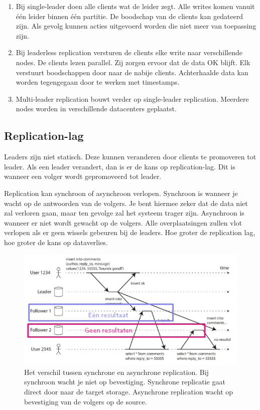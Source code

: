 \documentclass[a4paper,10pt,twoside]{report}
\begin{document}
\begin{enumerate}
	\item  Bij single-leader doen alle clients wat de leider zegt. Alle writes komen vanuit één leider binnen één partitie. De boodschap van de clients kan gedateerd zijn. Als gevolg kunnen acties uitgevoerd worden die niet meer van toepassing zijn. 
	\item Bij leaderless replication versturen de clients elke write naar verschillende nodes. De clients lezen parallel.  Zij zorgen ervoor dat de data OK blijft. Elk verstuurt boodschappen door naar de nabije clients. Achterhaalde data kan worden tegengegaan door te werken met timestamps.
	\item  Multi-leader replication bouwt verder op single-leader replication. Meerdere nodes worden in verschillende datacenters geplaatst.
\end{enumerate}

\subsection{Replication-lag}

Leaders zijn niet statisch. Deze kunnen veranderen door clients te promoveren tot leader. Als een leader verandert, dan is er de kans op replication-lag. Dit is wanneer een volger wordt gepromoveerd tot leader.

Replication kan synchroon of asynchroon verlopen. Synchroon is wanneer je wacht op de antwoorden van de volgers. Je bent hiermee zeker dat de data niet zal verloren gaan, maar ten gevolge zal het systeem trager zijn. Asynchroon is wanneer er niet wordt gewacht op de volgers. Alle overplaatsingen zullen vlot verlopen als er geen wissels gebeuren bij de leaders. Hoe groter de replication lag, hoe groter de kans op dataverlies.
 
\begin{figure}
 	\includegraphics[width=\linewidth]{../images/Screenshot_213.png}
 	\caption{Het verschil tussen synchrone en asynchrone replication. Bij synchroon wacht je niet op bevestiging. Synchrone replicatie gaat direct door naar de target storage. Asynchrone replication wacht op bevestiging van de volgers op de source.}
\end{figure}
\end{document}
